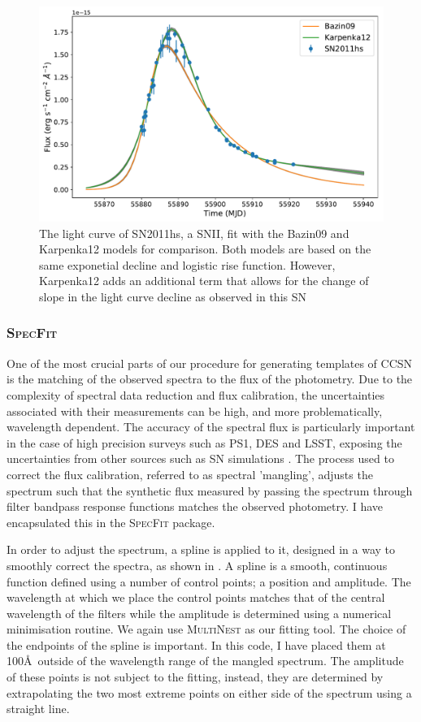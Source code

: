 \begin{figure}
  \centering
  \includegraphics[width=\textwidth]{Figures/Chapter3/CCModels}
  \caption{The light curve of SN2011hs, a SNII, fit with the Bazin09 and Karpenka12 models for comparison. Both models are based on the same exponetial decline and logistic rise function. However, Karpenka12 adds an additional term that allows for the change of slope in the light curve decline as observed in this SN}
  \label{fig:CCSNModelFits}
\end{figure}

\subsubsection{\textsc{SpecFit}}
One of the most crucial parts of our procedure for generating templates of CCSN is the matching of the observed spectra to the flux of the photometry. Due to the complexity of spectral data reduction and flux calibration, the uncertainties associated with their measurements can be high, and more problematically, wavelength dependent. The accuracy of the spectral flux is particularly important in the case of high precision surveys such as PS1, DES and LSST, exposing the uncertainties from other sources such as SN simulations \citep{Jones2016}. The process used to correct the flux calibration, referred to as spectral 'mangling', adjusts the spectrum such that the synthetic flux measured by passing the spectrum through filter bandpass response functions matches the observed photometry. I have encapsulated this in the \textsc{SpecFit} package.

In order to adjust the spectrum, a spline is applied to it, designed in a way to smoothly correct the spectra, as shown in . A spline is a smooth, continuous function defined using a number of control points; a position and amplitude. The wavelength at which we place the control points matches that of the central wavelength of the filters while the amplitude is determined using a numerical minimisation routine. We again use \textsc{MultiNest} as our fitting tool. The choice of the endpoints of the spline is important. In this code, I have placed them at 100\AA~outside of the wavelength range of the mangled spectrum. The amplitude of these points is not subject to the fitting, instead, they are determined by extrapolating the two most extreme points on either side of the spectrum using a straight line.

